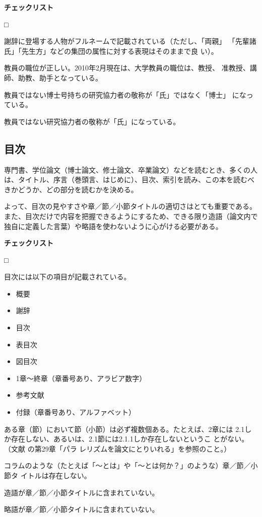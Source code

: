 \documentclass[11pt,a4j]{jsarticle}
\begin{document}
\begin{flushleft}
 {\bf チェックリスト}
\end{flushleft}
\begin{list}%
 {□} %
 {} %
 \item 謝辞に登場する人物がフルネームで記載されている（ただし、「両親」
       「先輩諸氏」「先生方」などの集団の属性に対する表現はそのままで良
       い）。
 \item 教員の職位が正しい。2010年2月現在は、大学教員の職位は、教授、
       准教授、講師、助教、助手となっている。
 \item 教員ではない博士号持ちの研究協力者の敬称が「氏」ではなく「博士」
       になっている。
 \item 教員ではない研究協力者の敬称が「氏」になっている。
\end{list}

\subsection{目次}

専門書、学位論文（博士論文、修士論文、卒業論文）などを読むとき、多くの人
は、タイトル、序言（巻頭言、はじめに）、目次、索引を読み、この本を読むべ
きかどうか、どの部分を読むかを決める。

よって、目次の見やすさや章／節／小節タイトルの適切さはとても重要である。
また、目次だけで内容を把握できるようにするため、できる限り造語（論文内で
独自に定義した言葉）や略語を使わないように心がける必要がある。

\begin{flushleft}
 {\bf チェックリスト}
\end{flushleft}
\begin{list}%
 {□} %
 {} %
 \item 目次には以下の項目が記載されている。
       \begin{itemize}
	\item 概要
	\item 謝辞
	\item 目次
	\item 表目次
	\item 図目次
	\item 1章〜終章（章番号あり、アラビア数字）
	\item 参考文献
	\item 付録（章番号あり、アルファベット）
       \end{itemize}
 \item ある章（節）において節（小節）は必ず複数個ある。たとえば、2章には
       2.1しか存在しない、あるいは、2.1節には2.1.1しか存在しないというこ
       とがない。 （文献 \cite{R.M.Lewis_HowToWrite_Ja_04} の第29章「パラ
       レリズムを論文にとりいれる」を参照のこと。）
 \item コラムのような（たとえば「〜とは」や「〜とは何か？」のような）章／節／小節タ
       イトルは存在しない。
 \item 造語が章／節／小節タイトルに含まれていない。
 \item 略語が章／節／小節タイトルに含まれていない。
\end{list}
\end{document}

